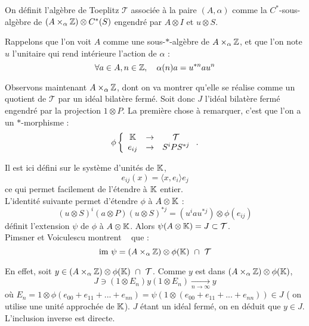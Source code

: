 \begin{definition}
On définit l'algèbre de Toeplitz $\mathcal T$ associée à la paire $(A,\alpha)$ comme la $C^*$-sous-algèbre de $(A\times_\alpha \mathbb Z)\otimes C^*(S)$ engendré par $A\otimes I$ et $u\otimes S$. 
\end{definition}
Rappelons que l'on voit $A$ comme une sous-$*$-algèbre de $A\times_\alpha \mathbb Z$, et que l'on note $u$ l'unitaire qui rend intérieure l'action de $\alpha$ :
\[\forall a\in A, n\in \mathbb Z, \quad \alpha(n)a=u^{*n} a u^n\]

Observons maintenant $A\times_\alpha \mathbb Z$, dont on va montrer qu'elle se réalise comme un quotient de $\mathcal T$ par un idéal bilatère fermé. Soit donc $J$ l'idéal bilatère fermé engendré par la projection $1\otimes P$. La première chose à remarquer, c'est que l'on a un $*$-morphisme :
\[\phi \left\{\begin{array}{ccc}\mathbb K & \rightarrow & \mathcal T\\
				e_{ij} & \rightarrow & S^i P S^{*j}\end{array}\right. .\]

Il est ici défini sur le système d'unités de $\mathbb K$, 
\[e_{ij}(x)=\langle x,e_i\rangle e_j\]
ce qui permet facilement de l'étendre à $\mathbb K$ entier. \\

L'identité suivante permet d'étendre $\phi$ à $A\otimes \mathbb K$ :
\[(u\otimes S)^i (a\otimes P) (u\otimes S)^{*j}=(u^i a u^{*j}) \otimes \phi (e_{ij})\]
définit l'extension $\psi$ de $\phi$ à $A\otimes \mathbb K$. Alors $\psi(A\otimes \mathbb K)=J\subset \mathcal T$.\\

Pimsner et Voiculescu montrent ~\cite{PV} que :
\begin{equation}
\text{im} \ \psi = (A\times _ \alpha \Z )\otimes \phi(\K) \ \cap \ \mathcal T
\label{image}
\end{equation}

En effet, soit $y\in (A\times _ \alpha \mathbb Z )\otimes \phi(\mathbb K) \ \cap \ \mathcal T$. Comme $y$ est dans $(A\times _ \alpha \mathbb Z )\otimes \phi(\mathbb K) $,
\[J \ni (1\otimes E_n) y (1\otimes E_n) \underset{n \rightarrow \infty}{\longrightarrow} y \]
où $E_n = 1\otimes\phi(e_{00}+e_{11}+...+e_{nn})=\psi (1\otimes(e_{00}+e_{11}+...+e_{nn}) )\in J$ ( on utilise une unité approchée de $\mathbb K$). $J$ étant un idéal fermé, on en déduit que $y\in J$. L'inclusion inverse est directe.\\

